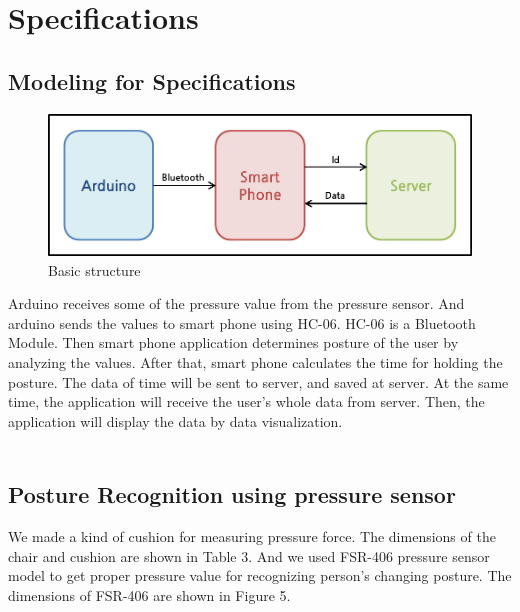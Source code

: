 \documentclass[conference]{IEEEtran}
\begin{document}
\section{Specifications}

\subsection{Modeling for Specifications \\}


\begin{figure}[H]
\begin{center}
    \includegraphics[scale=0.55]{img_04.png}
    \caption{Basic structure} 
\end{center}
\end{figure}


 Arduino receives some of the pressure value from the pressure sensor. And arduino sends the values to smart phone using HC-06. HC-06 is a Bluetooth Module. Then smart phone application determines posture of the user by analyzing the values. After that, smart phone calculates the time for holding the posture. The data of time will be sent to server, and saved at server.
At the same time, the application will receive the user's whole data from server. Then, the application will display the data by data visualization.\\\\

\subsection{Posture Recognition using pressure sensor}
 We made a kind of cushion for measuring pressure force. The dimensions of the chair and cushion are shown in Table 3. And we used FSR-406 pressure sensor model to get proper pressure value for recognizing person's changing posture. The dimensions of FSR-406 are shown in Figure 5.\\
 
\end{document}
